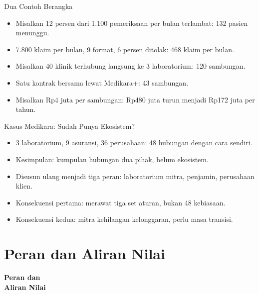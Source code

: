 \documentclass[aspectratio=169, table, 12pt]{beamer}
\begin{document}
\begin{frame}{{\Large Dua Contoh Berangka}}
  \vspace{10pt}
  \begin{itemize}
    \item Misalkan 12 persen dari 1.100 pemeriksaan per bulan terlambat: 132 pasien menunggu.
    \item 7.800 klaim per bulan, 9 format, 6 persen ditolak: 468 klaim per bulan.
    \item Misalkan 40 klinik terhubung langsung ke 3 laboratorium: 120 sambungan.
    \item Satu kontrak bersama lewat Medikara+: 43 sambungan.
    \item Misalkan Rp4 juta per sambungan: Rp480 juta turun menjadi Rp172 juta per tahun.
  \end{itemize}
\end{frame}

\begin{frame}{{\Large Kasus Medikara: Sudah Punya Ekosistem?}}
  \vspace{10pt}
  \begin{itemize}
    \item 3 laboratorium, 9 asuransi, 36 perusahaan: 48 hubungan dengan cara sendiri.
    \item Kesimpulan: kumpulan hubungan dua pihak, belum ekosistem.
    \item Disusun ulang menjadi tiga peran: laboratorium mitra, penjamin, perusahaan klien.
    \item Konsekuensi pertama: merawat tiga set aturan, bukan 48 kebiasaan.
    \item Konsekuensi kedua: mitra kehilangan kelonggaran, perlu masa transisi.
  \end{itemize}
\end{frame}

\section{Peran dan Aliran Nilai}

\begin{frame}{\hfill}
  \centering
  \Huge{\textbf{Peran dan\\Aliran Nilai}}
\end{frame}
\end{document}
